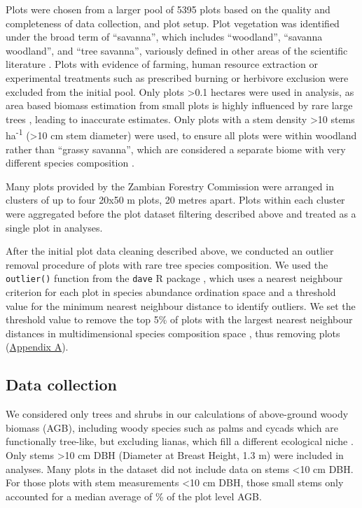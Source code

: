 \documentclass[11pt,a4paper]{article}
\begin{document}
Plots were chosen from a larger pool of 5395 plots based on the quality and completeness of data collection, and plot setup. Plot vegetation was identified under the broad term of ``savanna'', which includes ``woodland'', ``savanna woodland'', and ``tree savanna'', variously defined in other areas of the scientific literature \citep{Ratnam2011, Hill2010}. Plots with evidence of farming, human resource extraction or experimental treatments such as prescribed burning or herbivore exclusion were excluded from the initial pool. Only plots >0.1 hectares were used in analysis, as area based biomass estimation from small plots is highly influenced by rare large trees \citep{Stegen2011}, leading to inaccurate estimates. Only plots with a stem density >10 stems ha\textsuperscript{-1} (>10 cm stem diameter) were used, to ensure all plots were within woodland rather than ``grassy savanna'', which are considered a separate biome with very different species composition \citep{Parr2014}. 

Many plots provided by the Zambian Forestry Commission were arranged in clusters of up to four 20x50 m plots, 20 metres apart. Plots within each cluster were aggregated before the plot dataset filtering described above and treated as a single plot in analyses.

After the initial plot data cleaning described above, we conducted an outlier removal procedure of plots with rare tree species composition. We used the \verb|outlier()| function from the \verb|dave| R package \citep{dave}, which uses a nearest neighbour criterion for each plot in species abundance ordination space and a threshold value for the minimum nearest neighbour distance to identify outliers. We set the threshold value to remove the top 5\% of plots with the largest nearest neighbour distances in multidimensional species composition space \citep{Otto2013}, thus removing \noutliers{} plots (\hyperref[appendixa]{Appendix A}).

\subsection*{Data collection}
 
We considered only trees and shrubs in our calculations of above-ground woody biomass (AGB), including woody species such as palms and cycads which are functionally tree-like, but excluding lianas, which fill a different ecological niche \citep{Selaya2008}. Only stems >10 cm DBH (Diameter at Breast Height, 1.3 m) were included in analyses. Many plots in the dataset did not include data on stems <10 cm DBH. For those plots with stem measurements <10 cm DBH, those small stems only accounted for a median average of \percsmallagb{}\% of the plot level AGB. 
\end{document}
